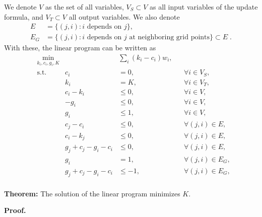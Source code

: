 \documentclass[12pt]{article}
\begin{document}
We denote $V$ as the set of all variables, $V_S\subset V$ as all input variables of the update formula, and $V_T\subset V$ all output variables.
We also denote
\[\begin{split}
E &= \{(j,i) : i \textrm{ depends on }j\},\\
E_G &= \{(j,i) : i \textrm{ depends on } j \textrm{ at neighboring grid points}\} \subset E \;.
\end{split}\]
With these, the linear program can be written as
\begin{equation}
\begin{aligned}
& \min_{k_i,c_i,g_i,K} && \sum_i (k_i - c_i) w_i,               && \\
& \textrm{s.t.} & c_i &= 0,                     && \forall i\in V_S, \\
&               & k_i &= K,                     && \forall i\in V_T, \\
&               & c_i - k_i &\le 0,             && \forall i\in V, \\
&               &-g_i &\le 0,                   && \forall i\in V, \\
&               & g_i &\le 1,                   && \forall i\in V, \\
&               & c_j - c_i &\le 0,             && \forall (j,i) \in E, \\
&               & c_i - k_j &\le 0,             && \forall (j,i) \in E, \\
&               & g_j + c_j - g_i - c_i &\le 0, && \forall (j,i) \in E, \\
&               & g_i &= 1,                     && \forall (j,i) \in E_G,\\
&               & g_j + c_j - g_i - c_i &\le-1, && \forall (j,i) \in E_G,\\
\end{aligned}
\end{equation}

{\bf Theorem:} The solution of the linear program minimizes $K$.

{\bf Proof.} 
\end{document}
